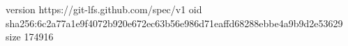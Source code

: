 version https://git-lfs.github.com/spec/v1
oid sha256:6c2a77a1e9f4072b920e672ec63b56e986d71eaffd68288ebbe4a9b9d2e53629
size 174916
